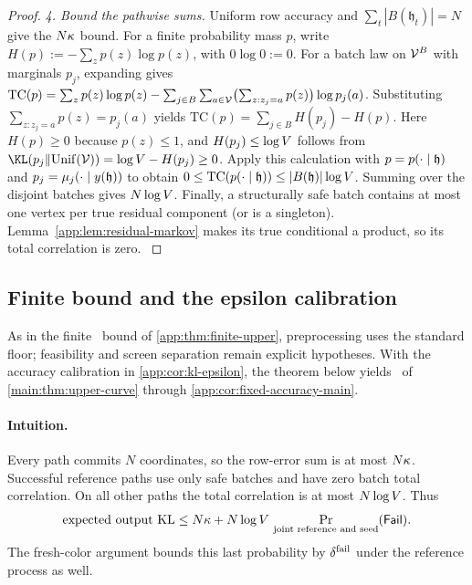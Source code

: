 \begin{proof}
{\emph{4. Bound the pathwise sums.}
Uniform row accuracy and
$\sum_t|B(\mathfrak h_t)|=N$ give the $N\KLRowBudget$ bound.
\hypertarget{app-finite-entropy}{}
For a finite probability mass $p$, write
$H(p):=-\sum_zp(z)\log p(z)$, with $0\log0:=0$.
For a batch law on $\Vocab^B$ with marginals $p_j$, expanding gives
$\mathrm{TC}(p)
 =\sum_zp(z)\log p(z)
   -\sum_{j\in B}\sum_{a\in\Vocab}
      \bigl(\sum_{z:z_j=a}p(z)\bigr)\log p_j(a)$.
Substituting $\sum_{z:z_j=a}p(z)=p_j(a)$ yields
$\mathrm{TC}(p)=\sum_{j\in B}H(p_j)-H(p)$.
Here $H(p)\ge0$ because $p(z)\le1$, and
$H(p_j)\le\log\VocabSize$ follows from
$\KLDivergence{p_j}{\operatorname{Unif}(\Vocab)}
 =\log\VocabSize-H(p_j)\ge0$.
Apply this calculation with $p=\JointBatchLaw{\mathfrak h}$ and
$p_j=\ExactRow{y(\mathfrak h)}{j}$ to obtain
$0\le\mathrm{TC}(\JointBatchLaw{\mathfrak h})
 \le|B(\mathfrak h)|\log\VocabSize$.
Summing over the disjoint batches gives $N\log\VocabSize$.
Finally, a structurally safe batch
contains at most one vertex per true residual component (or is a singleton).
Lemma~\ref{app:lem:residual-markov} makes its true conditional a product, so
its total correlation is zero.
}
\end{proof}

\subsection{Finite bound and the epsilon calibration}
\label{app:kl-finite}

As in the finite \HellingerCase\ bound of \cref{app:thm:finite-upper},
preprocessing uses the standard floor;
feasibility and screen separation remain explicit hypotheses.
With the accuracy calibration in \cref{app:cor:kl-epsilon}, the theorem
below yields \KLCase\ of \cref{main:thm:upper-curve} through
\cref{app:cor:fixed-accuracy-main}.

\paragraph{Intuition.}
Every path commits $N$ coordinates, so the row-error sum is at most
$N\KLRowBudget$.  Successful reference paths use only safe batches and
have zero batch total correlation.  On all other paths the total
correlation is at most $N\log\VocabSize$.  Thus
\[
 \hbox{expected output KL}
 \le N\KLRowBudget
     +N\log\VocabSize\,
        \Pr_{\text{joint reference and seed}}(\ScreenFailureEvent).
\]
The fresh-color argument bounds this last probability by
$\ScreenFailureBudget$ under the reference process as well.


